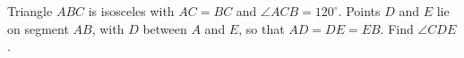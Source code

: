 Triangle $ABC$ is isosceles with $AC=BC$ and $\angle ACB=120^\circ$. Points $D$ and $E$ lie on segment $AB$, with $D$ between $A$ and $E$, so that $AD=DE=EB$. Find $\angle CDE$.
